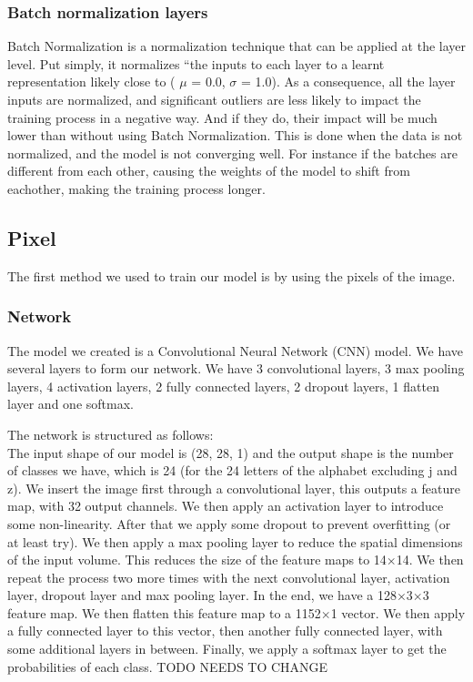 \documentclass[../paper.tex]{subfiles}
\begin{document}
    \subsubsection{Batch normalization layers}
    Batch Normalization is a normalization technique that can be applied at the layer level. 
    Put simply, it normalizes “the inputs to each layer to a learnt representation likely close to ( $\mu$ = 0.0, $\sigma$ = 1.0). 
    As a consequence, all the layer inputs are normalized, and significant outliers are less likely to impact the training process in a negative way. 
    And if they do, their impact will be much lower than without using Batch Normalization.\cite{o17}
    This is done when the data is not normalized, and the model is not converging well.
    For instance if the batches are different from each other, causing the weights of the model to shift from eachother, making the training process longer. 
    \subsection{Pixel}
    The first method we used to train our model is by using the pixels of the image.
    \subsubsection{Network}
    The model we created is a Convolutional Neural Network (CNN) model.
    We have several layers to form our network. 
    We have 3 convolutional layers, 3 max pooling layers, 4 activation layers, 2 fully connected layers, 2 dropout layers, 1 flatten layer and one softmax.

    The network is structured as follows:\\
    The input shape of our model is (28, 28, 1) and the output shape is the number of classes we have, which is 24 (for the 24 letters of the alphabet excluding j and z).
    We insert the image first through a convolutional layer, this outputs a feature map, with 32 output channels.
    We then apply an activation layer to introduce some non-linearity.
    After that we apply some dropout to prevent overfitting (or at least try).
    We then apply a max pooling layer to reduce the spatial dimensions of the input volume. This reduces the size of the feature maps to 14$\times$14.
    We then repeat the process two more times with the next convolutional layer, activation layer, dropout layer and max pooling layer.
    In the end, we have a 128$\times$3$\times$3 feature map. We then flatten this feature map to a 1152$\times$1 vector.
    We then apply a fully connected layer to this vector, then another fully connected layer, with some additional layers in between.
    Finally, we apply a softmax layer to get the probabilities of each class.
    TODO NEEDS TO CHANGE
    
\end{document}
